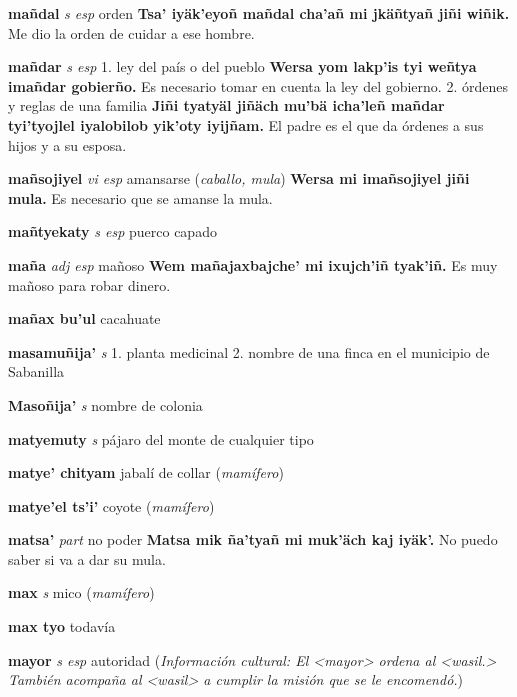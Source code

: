 \documentclass[10pt]{scrbook}
\newcommand{\entry}[1]{\textbf{#1}}
\newcommand{\onedefinition}[1]{#1.}
\newcommand{\partofspeech}[1]{\textit{#1}}
\newcommand{\spanishtranslation}[1]{#1}
\newcommand{\clarification}[1]{(\textit{#1})}
\newcommand{\cholexample}[1]{\textbf{#1}}
\newcommand{\exampletranslation}[1]{#1}
\newcommand{\culturalinformation}[1]{(\textit{#1})}
\begin{document}
\begin{multicols}{2}
\entry{mañdal}
\partofspeech{s esp}
\spanishtranslation{orden}
\cholexample{Tsa' iyäk'eyoñ mañdal cha'añ mi jkäñtyañ jiñi wiñik.}
\exampletranslation{Me dio la orden de cuidar a ese hombre.}

\entry{mañdar}
\partofspeech{s esp}
\onedefinition{1}
\spanishtranslation{ley del país o del pueblo}
\cholexample{Wersa yom lakp'is tyi weñtya imañdar gobierño.}
\exampletranslation{Es necesario tomar en cuenta la ley del gobierno.}
\onedefinition{2}
\spanishtranslation{órdenes y reglas de una familia}
\cholexample{Jiñi tyatyäl jiñäch mu'bä icha'leñ mañdar tyi'tyojlel iyalobilob yik'oty iyijñam.}
\exampletranslation{El padre es el que da órdenes a sus hijos y a su esposa.}

\entry{mañsojiyel}
\partofspeech{vi esp}
\spanishtranslation{amansarse}
\clarification{caballo, mula}
\cholexample{Wersa mi imañsojiyel jiñi mula.}
\exampletranslation{Es necesario que se amanse la mula.}

\entry{mañtyekaty}
\partofspeech{s esp}
\spanishtranslation{puerco capado}

\entry{maña}
\partofspeech{adj esp}
\spanishtranslation{mañoso}
\cholexample{Wem mañajaxbajche' mi ixujch'iñ tyak'iñ.}
\exampletranslation{Es muy mañoso para robar dinero.}

\entry{mañax bu'ul}
\spanishtranslation{cacahuate}

\entry{masamuñija'}
\partofspeech{s}
\onedefinition{1}
\spanishtranslation{planta medicinal}
\onedefinition{2}
\spanishtranslation{nombre de una finca en el municipio de Sabanilla}

\entry{Masoñija'}
\partofspeech{s}
\spanishtranslation{nombre de colonia}

\entry{matyemuty}
\partofspeech{s}
\spanishtranslation{pájaro del monte de cualquier tipo}

\entry{matye' chityam}
\spanishtranslation{jabalí de collar}
\clarification{mamífero}

\entry{matye'el ts'i'}
\spanishtranslation{coyote}
\clarification{mamífero}

\entry{matsa'}
\partofspeech{part}
\spanishtranslation{no poder}
\cholexample{Matsa mik ña'tyañ mi muk'äch kaj iyäk'.}
\exampletranslation{No puedo saber si va a dar su mula.}

\entry{max}
\partofspeech{s}
\spanishtranslation{mico}
\clarification{mamífero}

\entry{max tyo}
\spanishtranslation{todavía}

\entry{mayor}
\partofspeech{s esp}
\spanishtranslation{autoridad}
\culturalinformation{Información cultural: El <mayor> ordena al <wasil.> También acompaña al <wasil> a cumplir la misión que se le encomendó.}


\end{multicols}
\end{document}
